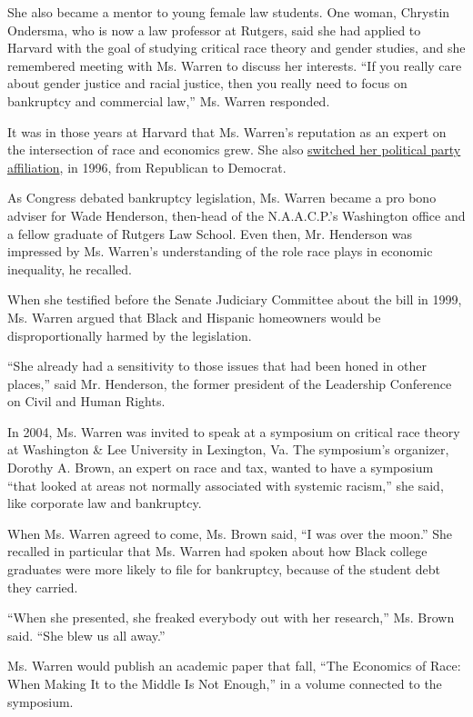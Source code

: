 She also became a mentor to young female law students. One woman,
Chrystin Ondersma, who is now a law professor at Rutgers, said she had
applied to Harvard with the goal of studying critical race theory and
gender studies, and she remembered meeting with Ms. Warren to discuss
her interests. ``If you really care about gender justice and racial
justice, then you really need to focus on bankruptcy and commercial
law,'' Ms. Warren responded.

It was in those years at Harvard that Ms. Warren's reputation as an
expert on the intersection of race and economics grew. She also
\href{https://www.nytimes3xbfgragh.onion/2019/08/25/us/politics/elizabeth-warren-republican-history.html}{switched
her political party affiliation}, in 1996, from Republican to Democrat.

As Congress debated bankruptcy legislation, Ms. Warren became a pro bono
adviser for Wade Henderson, then-head of the N.A.A.C.P.'s Washington
office and a fellow graduate of Rutgers Law School. Even then, Mr.
Henderson was impressed by Ms. Warren's understanding of the role race
plays in economic inequality, he recalled.

When she testified before the Senate Judiciary Committee about the bill
in 1999, Ms. Warren argued that Black and Hispanic homeowners would be
disproportionally harmed by the legislation.

``She already had a sensitivity to those issues that had been honed in
other places,'' said Mr. Henderson, the former president of the
Leadership Conference on Civil and Human Rights.

In 2004, Ms. Warren was invited to speak at a symposium on critical race
theory at Washington \& Lee University in Lexington, Va. The symposium's
organizer, Dorothy A. Brown, an expert on race and tax, wanted to have a
symposium ``that looked at areas not normally associated with systemic
racism,'' she said, like corporate law and bankruptcy.

When Ms. Warren agreed to come, Ms. Brown said, ``I was over the moon.''
She recalled in particular that Ms. Warren had spoken about how Black
college graduates were more likely to file for bankruptcy, because of
the student debt they carried.

``When she presented, she freaked everybody out with her research,'' Ms.
Brown said. ``She blew us all away.''

Ms. Warren would publish an academic paper that fall, ``The Economics of
Race: When Making It to the Middle Is Not Enough,'' in a volume
connected to the symposium.

